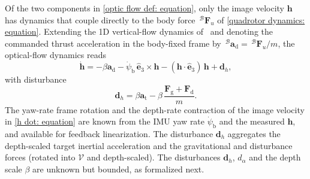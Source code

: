 \documentclass{IEEEtaes}
\theoremstyle{definition}
\theoremstyle{remark}
\begin{document}
Of the two components in \eqref{optic flow def: equation}, only the image velocity $\boldsymbol{h}$ has dynamics that couple directly to the body force $\,^\mathcal{B}\boldsymbol{F}_u$ of \eqref{quadrotor dynamics: equation}. Extending the 1D vertical-flow dynamics of~\cite{singhal2025} and denoting the commanded thrust acceleration in the body-fixed frame by $\,^\mathcal{B}\boldsymbol{a}_\text{d}=\,^\mathcal{B}\boldsymbol{F}_u/m$, the optical-flow dynamics reads
\begin{equation} \label{h dot: equation}
    \dot{\boldsymbol{h}} = -\beta\boldsymbol{a}_\text{d} - \dot{\psi}_\text{b}\,\hat{\boldsymbol{e}}_3\times\boldsymbol{h} - (\boldsymbol{h}\cdot\hat{\boldsymbol{e}}_3)\,\boldsymbol{h} + \boldsymbol{d}_h,
\end{equation}
with disturbance
\begin{equation} \label{d h: equation}
\boldsymbol{d}_h = \beta\boldsymbol{a}_\text{t} - \beta\,\frac{\boldsymbol{F}_\text{g}+\boldsymbol{F}_\text{d}}{m}.
\end{equation}
The yaw-rate frame rotation and the depth-rate contraction of the image velocity in \eqref{h dot: equation} are known from the IMU yaw rate $\dot{\psi}_\text{b}$ and the measured $\boldsymbol{h}$, and available for feedback linearization. The disturbance $\boldsymbol{d}_h$ aggregates the depth-scaled target inertial acceleration and the gravitational and disturbance forces (rotated into $\mathcal{V}$ and depth-scaled). The disturbances $\boldsymbol{d}_h$, $d_\alpha$ and the depth scale $\beta$ are unknown but bounded, as formalized next.
\end{document}
